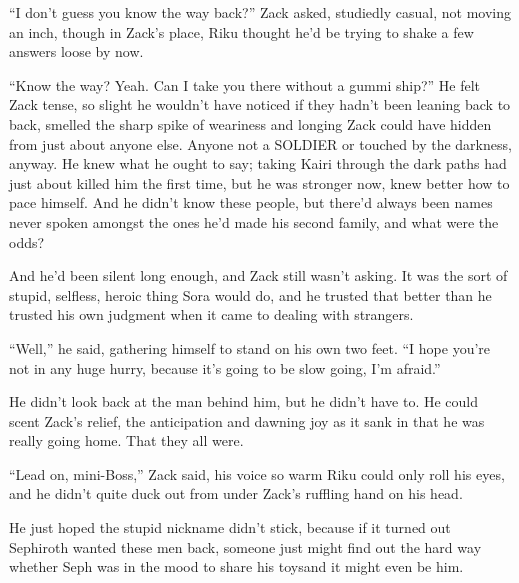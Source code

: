 ``I don't guess you know the way back?'' Zack asked, studiedly casual, not moving an inch, though in Zack's place, Riku thought he'd be trying to shake a few answers loose by now.
\begin{sloppypar}
``Know the way? Yeah. Can I take you there without a gummi ship?'' He felt Zack tense, so slight he wouldn't have noticed if they hadn't been leaning back to back, smelled the sharp spike of weariness and longing Zack could have hidden from just about anyone else. Anyone not a SOLDIER or touched by the darkness, anyway. He knew what he ought to say; taking Kairi through the dark paths had just about killed him the first time, but he was stronger now, knew better how to pace himself. And he didn't know these people, but there'd always been names never spoken amongst the ones he'd made his second family, and what were the odds?
\end{sloppypar}
And he'd been silent long enough, and Zack still wasn't asking. It was the sort of stupid, selfless, heroic thing Sora would do, and he trusted that better than he trusted his own judgment when it came to dealing with strangers.

``Well,'' he said, gathering himself to stand on his own two feet. ``I hope you're not in any huge hurry, because it's going to be slow going, I'm afraid.''

He didn't look back at the man behind him, but he didn't have to. He could scent Zack's relief, the anticipation and dawning joy as it sank in that he was really going home. That they all were.

``Lead on, mini-Boss,'' Zack said, his voice so warm Riku could only roll his eyes, and he didn't quite duck out from under Zack's ruffling hand on his head.

He just hoped the stupid nickname didn't stick, because if it turned out Sephiroth wanted these men back, someone just might find out the hard way whether Seph was in the mood to share his toys\textemdash and it might even be him.
